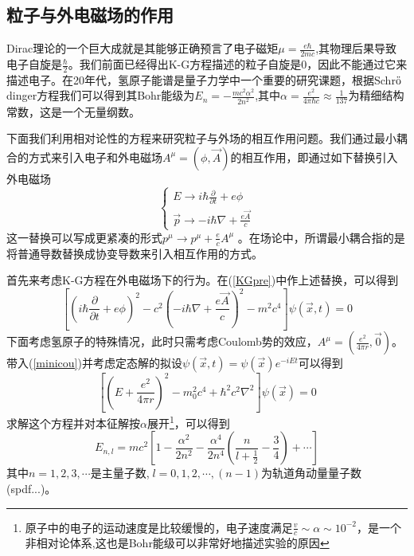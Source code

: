 \subsection{粒子与外电磁场的作用}
Dirac理论的一个巨大成就是其能够正确预言了电子磁矩$\mu=\frac{e\hbar}{2m c}$,其物理后果导致电子自旋是$\frac{\hbar}{2}$。我们前面已经得出K-G方程描述的粒子自旋是0，因此不能通过它来描述电子。在20年代，氢原子能谱是量子力学中一个重要的研究课题，根据Schr$\ddot{\rm{o}}$dinger方程我们可以得到其Bohr能级为$E_{n}=-\frac{mc^{2}\alpha^{2}}{2n^{2}}$,其中$\alpha=\frac{e^{2}}{4\pi \hbar c}\approx \frac{1}{137}$为精细结构常数，这是一个无量纲数。

下面我们利用相对论性的方程来研究粒子与外场的相互作用问题。我们通过最小耦合的方式来引入电子和外电磁场$A^{\mu}=(\phi,\vec{A})$的相互作用，即通过如下替换引入外电磁场
\begin{equation}
\label{minicou}
\left\{
        \begin{array}{ll}
            E \rightarrow i\hbar \frac{\partial}{\partial t}+e\phi\\
           \vec{p} \rightarrow -i\hbar \nabla +\frac{e\vec{A}}{c}
        \end{array}
    \right.
\end{equation}
这一替换可以写成更紧凑的形式$p^{\mu}\rightarrow p^{\mu}+\frac{e}{c}A^{\mu}$
。在场论中，所谓最小耦合指的是将普通导数替换成协变导数来引入相互作用的方式。

首先来考虑K-G方程在外电磁场下的行为。在(\ref{KGpre})中作上述替换，可以得到
\begin{equation}
    \left[\left(i\hbar \frac{\partial}{\partial t}+e\phi\right)^{2}-c^{2}\left(-i\hbar \nabla+\frac{e\vec{A}}{c}\right)^{2}-m^{2}c^{4}\right]\psi(\vec{x},t)=0
\end{equation}
下面考虑氢原子的特殊情况，此时只需考虑Coulomb势的效应，$A^{\mu}=(\frac{e^{2}}{4\pi r},\vec{0})$。带入(\ref{minicou})并考虑定态解的拟设$\psi(\vec{x},t)=\psi(\vec{x})e^{-iEt}$可以得到
\begin{equation}
    \left[\left(E+\frac{e^{2}}{4\pi r}\right)^{2}-m_{0}^{2}c^{4}+\hbar^{2}c^{2}\nabla^{2}\right]\psi(\vec{x})=0
\end{equation}
求解这个方程并对本征解按$\alpha$展开\footnote{原子中的电子的运动速度是比较缓慢的，电子速度满足$\frac{v}{c} \sim \alpha \sim 10^{-2}$，是一个非相对论体系,这也是Bohr能级可以非常好地描述实验的原因}，可以得到
\begin{equation}
\label{KGfield}
    E_{n,l}=mc^{2}\left[1-\frac{\alpha^{2}}{2n^{2}}-\frac{\alpha^{4}}{2n^{4}}\left(\frac{n}{l+\frac{1}{2}}-\frac{3}{4}\right)+\cdots\right]
\end{equation}
其中$n=1,2,3,\cdots$是主量子数,$\; l=0,1,2,\cdots,(n-1)$为轨道角动量量子数(spdf...)。

